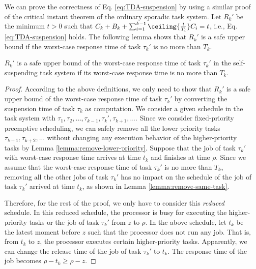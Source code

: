 We can prove the correctness of Eq. \eqref{eq:TDA-suspension} by using a similar proof of the critical instant theorem of the ordinary sporadic task system.
Let $R_k'$ be the minimum $t > 0$ such that  $C_k + B_k + \sum_{i=1}^{k-1}\ceiling{\frac{t}{T_i}} C_i = t$, i.e., Eq. \ref{eq:TDA-suspension} holds. The following lemma shows that $R_k'$ is a safe upper bound if the worst-case response time of task $\tau_k'$ is no more than $T_k$.

\begin{theorem}
\label{theorem:critical}
 $R_k'$ is a safe upper bound of the worst-case response time of task $\tau_k'$ in the self-suspending task system if its worst-case response time is no more than $T_k$.
\end{theorem}
\begin{proof}
According to the above definitions, we only need to show that $R_k'$ is a safe upper bound of the worst-case response time of task $\tau_k'$ by converting the suspension time of task $\tau_k$ as computation. We consider a given schedule in the task system with $\tau_1, \tau_2, \ldots, \tau_{k-1}, \tau_k', \tau_{k+1}, \ldots$. Since we consider fixed-priority preemptive scheduling, we can safely remove all the lower priority tasks $\tau_{k+1}, \tau_{k+2}, \ldots$ without changing any execution behavior of the higher-priority tasks by Lemma \ref{lemma:remove-lower-priority}. Suppose that the job of task $\tau_k'$ with worst-case response time arrives at time $t_k$ and finishes at time $\rho$. Since we assume that the worst-case response time of task $\tau_k'$ is no more than $T_k$,  removing all the other jobs of task $\tau_k'$ has no impact on the schedule of the job of task $\tau_k'$ arrived at time $t_k$, as shown in Lemma \ref{lemma:remove-same-task}. 


Therefore, for the rest of the proof, we only have to consider this \emph{reduced} schedule. In this reduced schedule, the processor is busy for executing the higher-priority tasks or the job of task $\tau_k'$ from $z$ to $\rho$. In the above schedule, let $t_{k}$ be the latest moment before $z$ such that the processor does not run any job. That is, from $t_k$ to $z$, the processor executes certain higher-priority tasks. Apparently, we can change the release time of the job of task $\tau_k'$ to $t_k$. The response time of the job becomes $\rho-t_k \geq \rho-z$. 


\end{proof}
